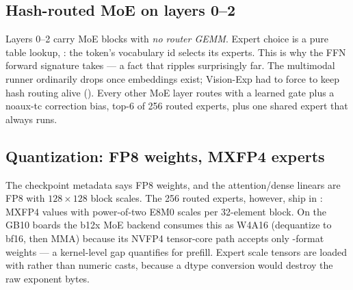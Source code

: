 \subsection{Hash-routed MoE on layers 0--2}

Layers 0--2 carry MoE blocks with \emph{no router GEMM}. Expert choice is a
pure table lookup, : the token's vocabulary id
selects its experts. This is why the FFN forward signature takes
 --- a fact that ripples surprisingly far. The multimodal
runner ordinarily drops  once embeddings exist; Vision-Exp had
to force  to keep hash routing alive
(). Every other MoE layer routes with a learned gate
plus a noaux-tc correction bias, top-6 of 256 routed experts, plus one shared
expert that always runs.

\subsection{Quantization: FP8 weights, MXFP4 experts}

The checkpoint metadata says FP8 weights, and the attention/dense linears are
FP8 with $128\times128$ block scales. The 256 routed experts, however, ship in
: MXFP4 values with power-of-two E8M0 scales per 32-element
block. On the GB10 boards the b12x MoE backend consumes this as W4A16
(dequantize to bf16, then MMA) because its NVFP4 tensor-core path accepts only
-format weights --- a kernel-level gap
 quantifies for prefill. Expert scale tensors are loaded with
 rather than numeric casts, because a dtype conversion would
destroy the raw exponent bytes.

